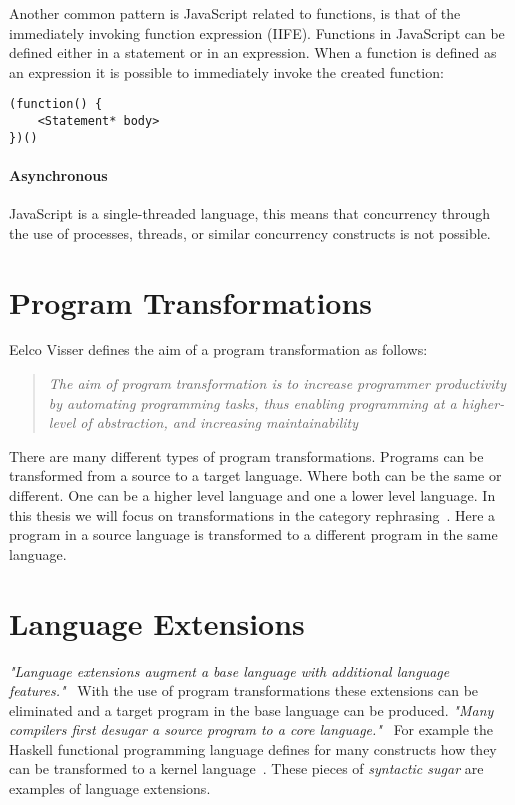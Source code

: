 Another common pattern is JavaScript related to functions, is that of the immediately invoking function expression (IIFE). Functions in JavaScript can be defined either in a statement or in an expression. When a function is defined as an expression it is possible to immediately invoke the created function:

\begin{lstlisting}[title=IIFE,caption={Immediately invoking function expression}]
(function() {
	<Statement* body>
})()
\end{lstlisting}

\paragraph{Asynchronous}
JavaScript is a single-threaded language, this means that concurrency through the use of processes, threads, or similar concurrency constructs is not possible.

\section{Program Transformations}
Eelco Visser defines the aim of a program transformation as follows:

\blockquote[\cite{Visser2001}]{\textit{The aim of program transformation is to increase programmer productivity by automating programming tasks, thus enabling programming at a higher-level of abstraction, and increasing maintainability}}

There are many different types of program transformations. Programs can be transformed from a source to a target language. Where both can be the same or different. One can be a higher level language and one a lower level language. In this thesis we will focus on transformations in the category rephrasing~\cite{Visser2001}. Here a program in a source language is transformed to a different program in the same language.

\section{Language Extensions} \label{lang-ext}
\textit{"Language extensions augment a base language with additional language features."}~\cite{Erdweg2014}
With the use of program transformations these extensions can be eliminated and a target program in the base language can be produced. \textit{"Many compilers first desugar a source program to a core language."}~\cite{Erdweg2014} For example the Haskell functional programming language defines for many constructs how they can be transformed to a kernel language~\cite{PeytonJones}. These pieces of \textit{syntactic sugar} are examples of language extensions.

